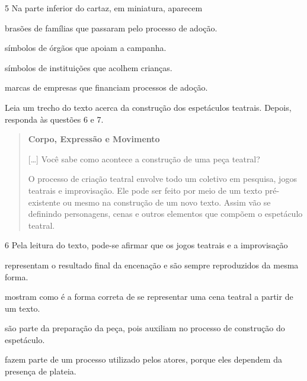 \num{5} Na parte inferior do cartaz, em miniatura, aparecem

\begin{escolha}
\item
  brasões de famílias que passaram pelo processo de adoção.
\item
  símbolos de órgãos que apoiam a campanha.
\item
  símbolos de instituições que acolhem crianças.
\item
  marcas de empresas que financiam processos de adoção.
\end{escolha}

\pagebreak
Leia um trecho do texto acerca da construção dos espetáculos teatrais.
Depois, responda às questões 6 e 7.

\begin{quote}
\textbf{Corpo, Expressão e Movimento}

{[}\ldots{}{]} Você sabe como acontece a construção de uma peça teatral?


O processo de criação teatral envolve todo um coletivo em pesquisa,
jogos teatrais e improvisação. Ele pode ser feito por meio de um texto
pré-existente ou mesmo na construção de um novo texto. Assim vão se
definindo personagens, cenas e outros elementos que compõem o espetáculo
teatral.

\end{quote}

\num{6} Pela leitura do texto, pode-se afirmar que os jogos teatrais e a
improvisação

\begin{escolha}
\item representam o resultado final da encenação e são sempre reproduzidos
da mesma forma.

\item mostram como é a forma correta de se representar uma cena teatral a
partir de um texto.

\item são parte da preparação da peça, pois auxiliam no processo de
construção do espetáculo.

\item fazem parte de um processo utilizado pelos atores, porque eles
dependem da presença de plateia.
\end{escolha}

